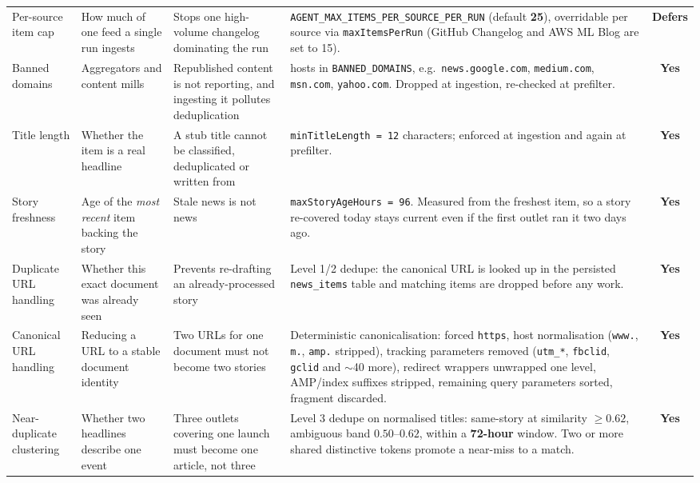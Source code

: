 \documentclass[11pt,a4paper]{article}
\newcommand{\var}[1]{\texttt{\small\hyphenpenalty=0\exhyphenpenalty=0\relax #1}}
\newcommand{\us}{\_\discretionary{}{}{}}
\newcommand{\brk}{\hyphenpenalty=0\exhyphenpenalty=0\relax}
\newcommand{\code}[1]{\texttt{\small\brk #1}}
\newcommand{\Yes}{\textcolor{aitkStop}{\textbf{Yes}}}
\newcommand{\Defer}{\textcolor{aitkHold}{\textbf{Defers}}}
\begin{document}
\begin{center}
\begin{longtable}{@{}>{\RaggedRight}p{2.6cm}>{\RaggedRight}p{2.9cm}>{\RaggedRight}p{3.0cm}>{\RaggedRight}p{4.4cm}c@{}}
Per-source item cap &
How much of one feed a single run ingests &
Stops one high-volume changelog dominating the run &
\var{AGENT\us MAX\us ITEMS\us PER\us SOURCE\us PER\us RUN} (default \textbf{25}), overridable
per source via \code{maxItemsPerRun} (GitHub Changelog and AWS ML Blog are set to 15). &
\Defer \\

Banned domains &
Aggregators and content mills &
Republished content is not reporting, and ingesting it pollutes deduplication &
9 hosts in \code{BANNED\_DOMAINS}, e.g.\ \code{news.google.com}, \code{medium.com},
\code{msn.com}, \code{yahoo.com}. Dropped at ingestion, re-checked at prefilter. &
\Yes \\

Title length &
Whether the item is a real headline &
A stub title cannot be classified, deduplicated or written from &
\code{minTitleLength = 12} characters; enforced at ingestion and again at prefilter. &
\Yes \\

Story freshness &
Age of the \emph{most recent} item backing the story &
Stale news is not news &
\code{maxStoryAgeHours = 96}. Measured from the freshest item, so a story
re-covered today stays current even if the first outlet ran it two days ago. &
\Yes \\

Duplicate URL handling &
Whether this exact document was already seen &
Prevents re-drafting an already-processed story &
Level 1/2 dedupe: the canonical URL is looked up in the persisted
\code{news\_items} table and matching items are dropped before any work. &
\Yes \\

Canonical URL handling &
Reducing a URL to a stable document identity &
Two URLs for one document must not become two stories &
Deterministic canonicalisation: forced \code{https}, host normalisation
(\code{www.}, \code{m.}, \code{amp.} stripped), tracking parameters removed
(\code{utm\_*}, \code{fbclid}, \code{gclid} and $\sim$40 more), redirect wrappers
unwrapped one level, AMP/index suffixes stripped, remaining query parameters
sorted, fragment discarded. &
\Yes \\

Near-duplicate clustering &
Whether two headlines describe one event &
Three outlets covering one launch must become one article, not three &
Level 3 dedupe on normalised titles: same-story at similarity
$\geq \mathbf{0.62}$, ambiguous band $0.50$--$0.62$, within a
\textbf{72-hour} window. Two or more shared distinctive tokens promote a
near-miss to a match. &
\Yes \\


\end{longtable}
\end{center}
\end{document}
